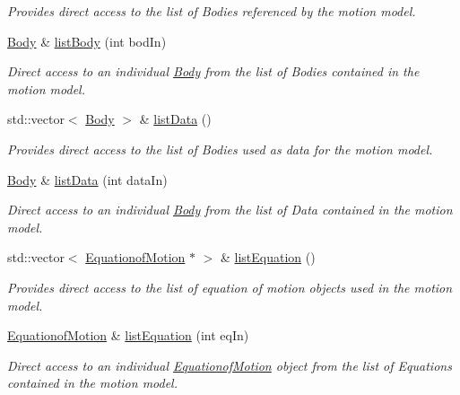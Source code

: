\begin{DoxyCompactItemize}
\begin{DoxyCompactList}\small\item\em Provides direct access to the list of Bodies referenced by the motion model. \end{DoxyCompactList}\item 
\hyperlink{classosea_1_1ofreq_1_1_body}{Body} \& \hyperlink{classosea_1_1ofreq_1_1_motion_model_a3c08da3c6cb3e959b53f2cf6f614d3c0}{list\-Body} (int bod\-In)
\begin{DoxyCompactList}\small\item\em Direct access to an individual \hyperlink{classosea_1_1ofreq_1_1_body}{Body} from the list of Bodies contained in the motion model. \end{DoxyCompactList}\item 
std\-::vector$<$ \hyperlink{classosea_1_1ofreq_1_1_body}{Body} $>$ \& \hyperlink{classosea_1_1ofreq_1_1_motion_model_ae63712716bcaff9ff263d9728f39323a}{list\-Data} ()
\begin{DoxyCompactList}\small\item\em Provides direct access to the list of Bodies used as data for the motion model. \end{DoxyCompactList}\item 
\hyperlink{classosea_1_1ofreq_1_1_body}{Body} \& \hyperlink{classosea_1_1ofreq_1_1_motion_model_a1d7e2b929c15789259aaf732efd7f752}{list\-Data} (int data\-In)
\begin{DoxyCompactList}\small\item\em Direct access to an individual \hyperlink{classosea_1_1ofreq_1_1_body}{Body} from the list of Data contained in the motion model. \end{DoxyCompactList}\item 
std\-::vector$<$ \hyperlink{classosea_1_1ofreq_1_1_equationof_motion}{Equationof\-Motion} $\ast$ $>$ \& \hyperlink{classosea_1_1ofreq_1_1_motion_model_a998756fbf76a5c65773f5eae7bf9a3e1}{list\-Equation} ()
\begin{DoxyCompactList}\small\item\em Provides direct access to the list of equation of motion objects used in the motion model. \end{DoxyCompactList}\item 
\hyperlink{classosea_1_1ofreq_1_1_equationof_motion}{Equationof\-Motion} \& \hyperlink{classosea_1_1ofreq_1_1_motion_model_a444cd6e6ca1aea0822545b732118aeb9}{list\-Equation} (int eq\-In)
\begin{DoxyCompactList}\small\item\em Direct access to an individual \hyperlink{classosea_1_1ofreq_1_1_equationof_motion}{Equationof\-Motion} object from the list of Equations contained in the motion model. \end{DoxyCompactList}\item 

\end{DoxyCompactItemize}
